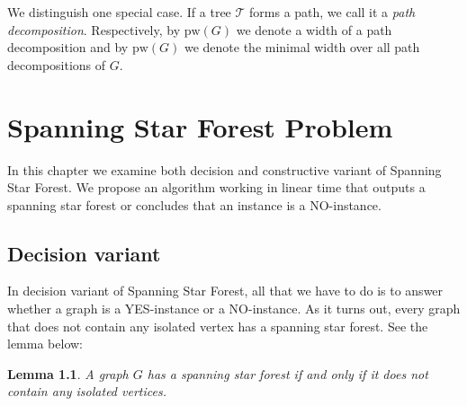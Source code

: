 \documentclass[en]{pracamgr}
\newtheorem{lemma}{Lemma}
\theoremstyle{definition}
\newcommand{\ssf}{spanning star forest}
\newcommand{\ssfp}{{\sc Spanning Star Forest}}
\begin{document}
We distinguish one special case. If a tree $\mathcal{T}$ forms a path, we call it a \emph{path decomposition}. Respectively, by $\textrm{pw}(G)$ we denote a width of a path decomposition and by $\textrm{pw}(G)$ we denote the minimal width over all path decompositions of $G$.

\chapter{Spanning Star Forest Problem}\label{sec3}

In this chapter we examine both decision and constructive variant of \ssfp{}. We propose an algorithm working in linear time that outputs a \ssf{} or concludes that an instance is a NO-instance.

\section{Decision variant}

In decision variant of \ssfp{}, all that we have to do is to answer whether a graph is a YES-instance or a NO-instance. As it turns out, every graph that does not contain any isolated vertex has a \ssf{}. See the lemma below:

\begin{lemma}\label{SSF lemma}
 A graph $G$ has a \ssf{} if and only if it does not contain any isolated vertices.
\end{lemma}
\end{document}
